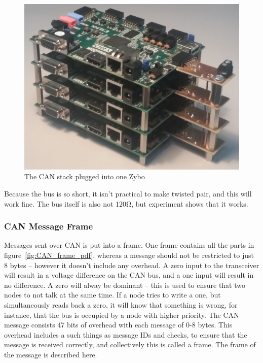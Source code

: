 \begin{figure}[H]
	\centering
	\includegraphics[width = 0.9\linewidth]{graphics/CAN_stack_picture}
	\caption{The CAN stack plugged into one Zybo}
	\label{fig:CAN_stack_picture}
\end{figure}

Because the bus is so short, it isn't practical to make twisted pair, and this will work fine.
The bus itself is also not $120 \si{\ohm}$, but experiment shows that it works.


\subsubsection{CAN Message Frame}\label{sub:CanMessageFrame}
Messages sent over CAN is put into a frame. 
One frame contains all the parts in figure~\ref{fig:CAN_frame_pdf}, whereas a message should not be restricted to just 8 bytes -- however it doesn't include any overhead.
A zero input to the transceiver will result in a voltage difference on the CAN bus, and a one input will result in no difference. 
A zero will alway be dominant -- this is used to ensure that two nodes to not talk at the same time.
If a node tries to write a one, but simultaneously reads back a zero, it will know that something is wrong, for instance, that the bus is occupied by a node with higher priority.
The CAN message consists 47 bits of overhead with each message of 0-8 bytes. 
This overhead includes a such things as message IDs and checks, to ensure that the message is received correctly, and collectively this is called a frame. 
The frame of the message is described here.

